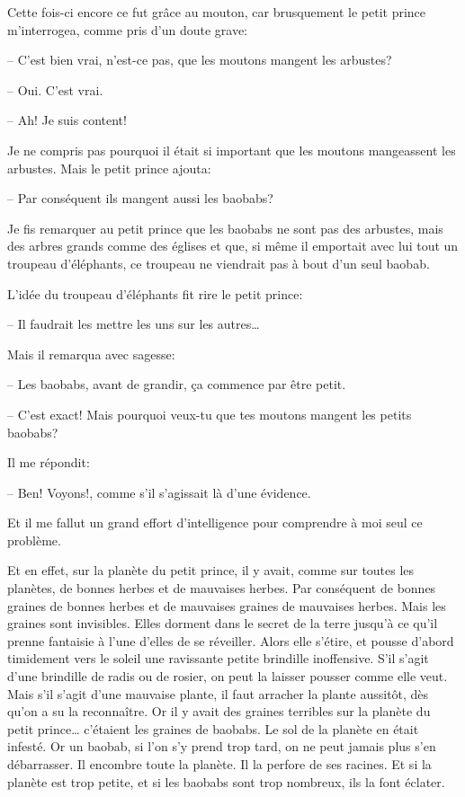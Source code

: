 \begin{Parallel}[p]{}{}
{Cette fois-ci encore ce fut grâce au mouton, car
brusquement le petit prince m'interrogea, comme
pris d'un doute grave:

-- C'est bien vrai, n'est-ce pas, que les moutons
mangent les arbustes?

-- Oui. C'est vrai.

-- Ah! Je suis content!

Je ne compris pas pourquoi il était si important
que les moutons mangeassent les arbustes. Mais le
petit prince ajouta:

-- Par conséquent ils mangent aussi les baobabs?

Je fis remarquer au petit prince que les baobabs
ne sont pas des arbustes, mais des arbres grands
comme des églises et que, si même il emportait avec
lui tout un troupeau d'éléphants, ce troupeau ne
viendrait pas à bout d'un seul baobab.

L'idée du troupeau d'éléphants fit rire le petit
prince:

-- Il faudrait les mettre les uns sur les autres\ldots{}

Mais il remarqua avec sagesse:

-- Les baobabs, avant de grandir, ça commence par
être petit.

-- C'est exact! Mais pourquoi veux-tu que tes
moutons mangent les petits baobabs?

Il me répondit:

-- Ben! Voyons!, comme s'il s'agissait là d'une évidence.

Et il me fallut un grand effort d'intelligence pour comprendre à moi seul ce problème.

Et en effet, sur la planète du petit prince, il y
avait, comme sur toutes les planètes, de bonnes herbes et de mauvaises herbes. Par conséquent de bonnes graines de bonnes herbes et de mauvaises graines de mauvaises herbes. Mais les graines sont
invisibles. Elles dorment dans le secret de la terre
jusqu'à ce qu'il prenne fantaisie à l'une d'elles de se
réveiller. Alors elle s'étire, et pousse d'abord timidement vers le soleil une ravissante petite brindille
inoffensive. S'il s'agit d'une brindille de radis ou de
rosier, on peut la laisser pousser comme elle veut.
Mais s'il s'agit d'une mauvaise plante, il faut arracher la plante aussitôt, dès qu'on a su la reconnaître. Or il y avait des graines terribles sur la planète du petit prince\ldots{} c'étaient les graines de
baobabs. Le sol de la planète en était infesté. Or un
baobab, si l'on s'y prend trop tard, on ne peut
jamais plus s'en débarrasser. Il encombre toute la
planète. Il la perfore de ses racines. Et si la planète
est trop petite, et si les baobabs sont trop nombreux,
ils la font éclater.

}
\end{Parallel}
